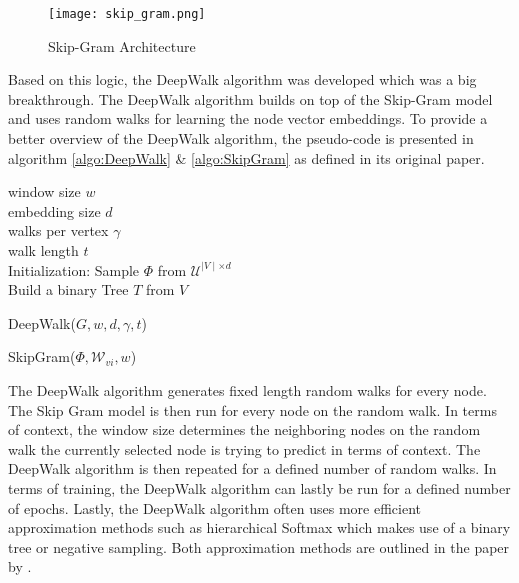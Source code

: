 	\begin{figure}
		\centering
		\texttt{[image: skip\_gram.png]}
		\caption{Skip-Gram Architecture}
		\cite[p. 5]{mikolov2013efficient}
		\label{fig:skip_gram}
	\end{figure}

	\noindent Based on this logic, the DeepWalk algorithm was developed which was a big
	breakthrough. The DeepWalk algorithm builds on top of the Skip-Gram model and 
	uses random walks for learning the node vector embeddings. To provide a 
	better overview of the DeepWalk algorithm, the pseudo-code is presented in 
	algorithm \ref{algo:DeepWalk} \& \ref{algo:SkipGram} as defined in its original paper.
	
	\begin{algorithm}
		\scriptsize
		\SetAlgoLined
		window size $w$\\
		embedding size $d$\\
		walks per vertex $\gamma$\\
		walk length $t$\\
		\nl Initialization: Sample $\Phi$ from $\mathcal{U}^{\mid V
		\mid \times d}$ \\
		\nl Build a binary Tree $T$ from $V$ \\
		\nl {}
		\caption{DeepWalk($G,w,d,\gamma,t$)}
		\label{algo:DeepWalk}
	\end{algorithm}
	
	\begin{algorithm}
		\scriptsize
		\SetAlgoLined
		\nl \ForEach{$v_j \in \mathcal{W}_{vi}$}{
		\nl		\ForEach{$u_k \in \mathcal{W}_{vi}[j-w:j+w]$}{
		\nl			$J(\Phi) = - \log \Pr(u_k \mid \Phi(v_j))$\\
		\nl			$\Phi = \Phi - \alpha * \frac{\partial J}{\partial \Phi}$
				}
			}
		\caption{SkipGram($\Phi,\mathcal{W}_{vi},w$)}
		\label{algo:SkipGram}
	\end{algorithm}
	
	\vspace{5mm}
	
	\noindent The DeepWalk algorithm generates fixed length random walks for
	every node. The Skip Gram model is then run for every node on the random
	walk. In terms of context, the window size determines the neighboring nodes 
	on the random walk the currently selected node is trying to predict in
	terms of context. The DeepWalk algorithm is then repeated for a defined
	number of random walks. In terms of training, the DeepWalk algorithm can
	lastly be run for a defined number of epochs. Lastly, the DeepWalk
	algorithm often uses more efficient approximation methods such as
	hierarchical Softmax which makes use of a binary tree or negative sampling.
	Both approximation methods are outlined in the paper by
	\cite{mikolov2013distributed}. \\

